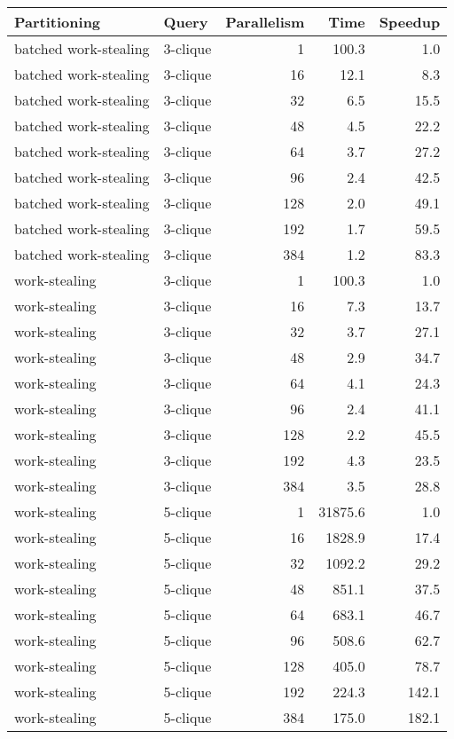 \begin{tabular}{llr|rr}
\toprule
          Partitioning &     Query &  Parallelism &     Time &  Speedup \\
\midrule
 batched work-stealing &  3-clique &            1 &    100.3 &      1.0 \\
 batched work-stealing &  3-clique &           16 &     12.1 &      8.3 \\
 batched work-stealing &  3-clique &           32 &      6.5 &     15.5 \\
 batched work-stealing &  3-clique &           48 &      4.5 &     22.2 \\
 batched work-stealing &  3-clique &           64 &      3.7 &     27.2 \\
 batched work-stealing &  3-clique &           96 &      2.4 &     42.5 \\
 batched work-stealing &  3-clique &          128 &      2.0 &     49.1 \\
 batched work-stealing &  3-clique &          192 &      1.7 &     59.5 \\
 batched work-stealing &  3-clique &          384 &      1.2 &     83.3 \\
         work-stealing &  3-clique &            1 &    100.3 &      1.0 \\
         work-stealing &  3-clique &           16 &      7.3 &     13.7 \\
         work-stealing &  3-clique &           32 &      3.7 &     27.1 \\
         work-stealing &  3-clique &           48 &      2.9 &     34.7 \\
         work-stealing &  3-clique &           64 &      4.1 &     24.3 \\
         work-stealing &  3-clique &           96 &      2.4 &     41.1 \\
         work-stealing &  3-clique &          128 &      2.2 &     45.5 \\
         work-stealing &  3-clique &          192 &      4.3 &     23.5 \\
         work-stealing &  3-clique &          384 &      3.5 &     28.8 \\
         work-stealing &  5-clique &            1 &  31875.6 &      1.0 \\
         work-stealing &  5-clique &           16 &   1828.9 &     17.4 \\
         work-stealing &  5-clique &           32 &   1092.2 &     29.2 \\
         work-stealing &  5-clique &           48 &    851.1 &     37.5 \\
         work-stealing &  5-clique &           64 &    683.1 &     46.7 \\
         work-stealing &  5-clique &           96 &    508.6 &     62.7 \\
         work-stealing &  5-clique &          128 &    405.0 &     78.7 \\
         work-stealing &  5-clique &          192 &    224.3 &    142.1 \\
         work-stealing &  5-clique &          384 &    175.0 &    182.1 \\
\bottomrule
\end{tabular}
